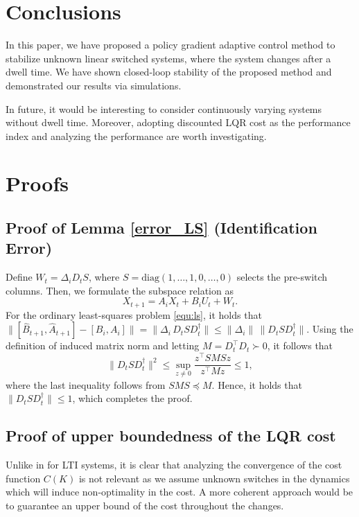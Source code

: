 \documentclass[letterpaper, 10 pt, conference]{ieeeconf}  %
\begin{document}
\section{Conclusions}
In this paper, we have proposed a policy gradient adaptive control method to stabilize unknown linear switched systems, where the system changes after a dwell time. We have shown closed-loop stability of the proposed method and demonstrated our results via simulations.

In future, it would be interesting to consider continuously varying systems without dwell time. Moreover, adopting discounted LQR cost as the performance index and analyzing the performance are worth investigating.

 
\appendices
\section{Proofs}
\subsection{Proof of Lemma \ref{error_LS} (Identification Error)} 
Define \(W_t = \Delta_iD_t S\), where \(S=\mathrm{diag}(1,\ldots,1,0,\ldots,0)\) selects the pre-switch columns. Then, we formulate the subspace relation as 
\begin{equation}
    X_{t+1} = A_i X_t +B_iU_t + W_t.
\end{equation}
 For the ordinary least-squares problem \eqref{equ:ls}, it holds that $\|[\hat{B}_{t+1}, \hat{A}_{t+1}] - [B_i, A_i]\| = \|\Delta_i\, D_t S D_t^\dagger\| \leq \|\Delta_i\|\,\|D_t S D_t^\dagger\|$. Using the definition of induced matrix norm and letting \(M=D_t^\top D_t\succ0\), it follows that
\[
\|D_t S D_t^\dagger\|^2
\leq \sup_{z\neq 0} \frac{z^\top S M S z}{z^\top M z}
\leq 1,
\]
where the last inequality follows from \(SMS\preceq M\). Hence, it holds that \(\|D_t S D_t^\dagger\|\le 1\), which completes the proof.

\subsection{Proof of upper boundedness of the LQR cost} 

 
Unlike in \cite{zhao2025policy} for LTI systems, it is clear that analyzing the convergence of the cost function $C(K)$ is not relevant as we assume unknown switches in the dynamics which will induce non-optimality in the cost. A more coherent approach would be to guarantee an upper bound of the cost throughout the changes. 
\end{document}
